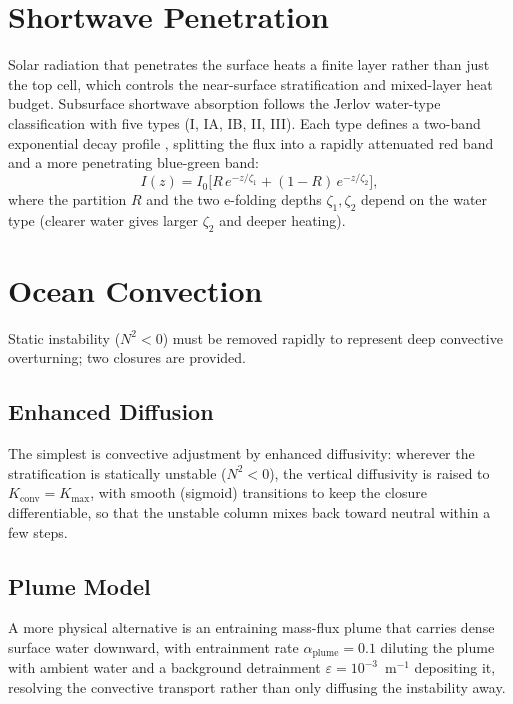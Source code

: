 \documentclass[11pt,twoside]{report}
\begin{document}
\section{Shortwave Penetration}

Solar radiation that penetrates the surface heats a finite layer rather
than just the top cell, which controls the near-surface stratification and
mixed-layer heat budget.  Subsurface shortwave absorption follows the
Jerlov water-type classification \citep{Jerlov1976}
with five types (I, IA, IB, II, III).  Each type defines a two-band
exponential decay profile \citep{PaulsonSimpson1977}, splitting the flux into a rapidly attenuated
red band and a more penetrating blue-green band:
\begin{equation}
  I(z) = I_0\bigl[R\,e^{-z/\zeta_1} + (1-R)\,e^{-z/\zeta_2}\bigr],
\end{equation}
where the partition $R$ and the two e-folding depths $\zeta_1,\zeta_2$
depend on the water type (clearer water gives larger $\zeta_2$ and deeper
heating).

\section{Ocean Convection}

Static instability ($N^2<0$) must be removed rapidly to represent deep
convective overturning; two closures are provided.

\subsection{Enhanced Diffusion}
The simplest is convective adjustment by enhanced diffusivity: wherever the
stratification is statically unstable ($N^2 < 0$), the vertical diffusivity
is raised to $K_{\mathrm{conv}} = K_{\mathrm{max}}$, with smooth (sigmoid)
transitions to keep the closure differentiable, so that the unstable column
mixes back toward neutral within a few steps.

\subsection{Plume Model}
A more physical alternative is an entraining mass-flux plume that carries
dense surface water downward, with entrainment rate
$\alpha_{\mathrm{plume}}=0.1$ diluting the plume with ambient water and a
background detrainment $\varepsilon=10^{-3}$~m$^{-1}$ depositing it,
resolving the convective transport rather than only diffusing the
instability away.
\end{document}

